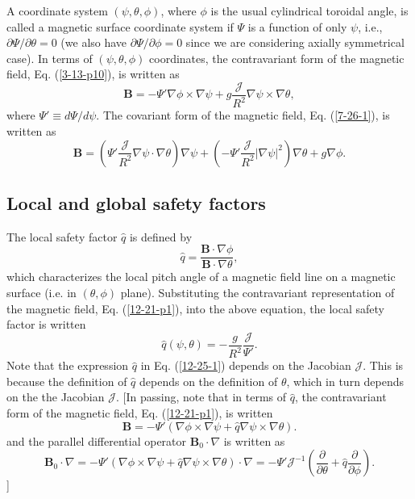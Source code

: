 \documentclass{article}
\begin{document}
A coordinate system $(\psi, \theta, \phi)$, where $\phi$ is the usual
cylindrical toroidal angle, is called a magnetic surface coordinate system if
$\Psi$ is a function of only $\psi$, i.e., $\partial \Psi / \partial \theta =
0$ (we also have $\partial \Psi / \partial \phi = 0$ since we are considering
axially symmetrical case). In terms of $(\psi, \theta, \phi)$ coordinates, the
contravariant form of the magnetic field, Eq. (\ref{3-13-p10}), is written as
\begin{equation}
  \label{12-21-p1} \mathbf{B}= - \Psi' \nabla \phi \times \nabla \psi + g
  \frac{\mathcal{J}}{R^2} \nabla \psi \times \nabla \theta,
\end{equation}
where $\Psi' \equiv d \Psi / d \psi$. The covariant form of the magnetic
field, Eq. (\ref{7-26-1}), is written as
\begin{equation}
  \label{5-6-2} \mathbf{B}= \left( \Psi' \frac{\mathcal{J}}{R^2} \nabla \psi
  \cdot \nabla \theta \right) \nabla \psi + \left( - \Psi'
  \frac{\mathcal{J}}{R^2} | \nabla \psi |^2 \right) \nabla \theta + g \nabla
  \phi .
\end{equation}

\subsection{\label{7-25-e5}Local and global safety factors}

The local safety factor $\hat{q}$ is defined by
\begin{equation}
  \label{7-12-a4} \hat{q} = \frac{\mathbf{B} \cdot \nabla \phi}{\mathbf{B}
  \cdot \nabla \theta},
\end{equation}
which characterizes the local pitch angle of a magnetic field line on a
magnetic surface (i.e. in $(\theta, \phi)$ plane). Substituting the
contravariant representation of the magnetic field, Eq. (\ref{12-21-p1}), into
the above equation, the local safety factor is written
\begin{equation}
  \label{12-25-1} \hat{q} (\psi, \theta) = - \frac{g}{R^2} 
  \frac{\mathcal{J}}{\Psi'} .
\end{equation}
Note that the expression $\hat{q}$ in Eq. (\ref{12-25-1}) depends on the
Jacobian $\mathcal{J}$. This is because the definition of $\hat{q}$ depends on
the definition of $\theta$, which in turn depends on the the Jacobian
$\mathcal{J}$. [In passing, note that in terms of $\hat{q}$, the contravariant
form of the magnetic field, Eq. (\ref{12-21-p1}), is written
\begin{equation}
  \label{18-3-9-a1} \mathbf{B}= - \Psi' (\nabla \phi \times \nabla \psi +
  \hat{q} \nabla \psi \times \nabla \theta) .
\end{equation}
and the parallel differential operator $\mathbf{B}_0 \cdot \nabla$ is written
as
\begin{equation}
  \label{18-8-21-e1} \mathbf{B}_0 \cdot \nabla = - \Psi' (\nabla \phi \times
  \nabla \psi + \hat{q} \nabla \psi \times \nabla \theta) \cdot \nabla = -
  \Psi' \mathcal{J}^{- 1} \left( \frac{\partial}{\partial \theta} + \hat{q}
  \frac{\partial}{\partial \phi} \right) .
\end{equation}
]
\end{document}
